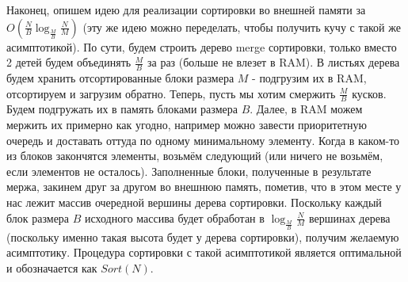 Наконец, опишем идею для реализации сортировки во внешней памяти за $O(\frac{N}{B} \log_{\frac{M}{B}} \frac{N}{M})$ (эту же идею можно переделать, чтобы получить кучу с такой же асимптотикой). По сути, будем строить дерево merge сортировки, только вместо 2 детей будем объединять $\frac{M}{B}$ за раз (больше не влезет в RAM). В листьях дерева будем хранить отсортированные блоки размера $M$ - подгрузим их в RAM, отсортируем и загрузим обратно. Теперь, пусть мы хотим смержить $\frac{M}{B}$ кусков. Будем подгружать их в память блоками размера $B$. Далее, в RAM можем мержить их примерно как угодно, например можно завести приоритетную очередь и доставать оттуда по одному минимальному элементу. Когда в каком-то из блоков закончятся элементы, возьмём следующий (или ничего не возьмём, если элементов не осталось). Заполненные блоки, полученные в результате мержа, закинем друг за другом во внешнюю память, пометив, что в этом месте у нас лежит массив очередной вершины дерева сортировки. Поскольку каждый блок размера $B$ исходного массива будет обработан в $\log_{\frac{M}{B}} \frac{N}{M}$ вершинах дерева (поскольку именно такая высота будет у дерева сортировки), получим желаемую асимптотику. Процедура сортировки с такой асимптотикой является оптимальной и обозначается как $Sort(N)$.
